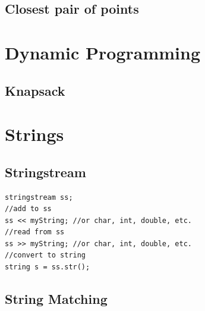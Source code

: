 \documentclass[10pt,a4paper,titlepage]{article}
\begin{document}



\subsection{Closest pair of points}



\fi

\section{Dynamic Programming}
\subsection{Knapsack}



\section{Strings}
\subsection{Stringstream}
\begin{lstlisting}
stringstream ss;
//add to ss
ss << myString; //or char, int, double, etc.
//read from ss
ss >> myString; //or char, int, double, etc.
//convert to string
string s = ss.str();
\end{lstlisting}
\subsection{String Matching}
\end{document}
